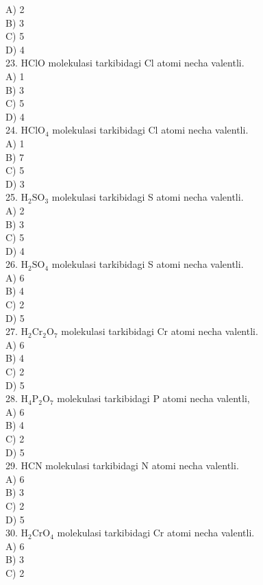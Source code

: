 A) 2\\
B) 3\\
C) 5\\
D) 4\\
23. HClO molekulasi tarkibidagi Cl atomi necha valentli.\\
A) 1\\
B) 3\\
C) 5\\
D) 4\\
24. $\mathrm{HClO}_{4}$ molekulasi tarkibidagi Cl atomi necha valentli.\\
A) 1\\
B) 7\\
C) 5\\
D) 3\\
25. $\mathrm{H}_{2} \mathrm{SO}_{3}$ molekulasi tarkibidagi S atomi necha valentli.\\
A) 2\\
B) 3\\
C) 5\\
D) 4\\
26. $\mathrm{H}_{2} \mathrm{SO}_{4}$ molekulasi tarkibidagi S atomi necha valentli.\\
A) 6\\
B) 4\\
C) 2\\
D) 5\\
27. $\mathrm{H}_{2} \mathrm{Cr}_{2} \mathrm{O}_{7}$ molekulasi tarkibidagi Cr atomi necha valentli.\\
A) 6\\
B) 4\\
C) 2\\
D) 5\\
28. $\mathrm{H}_{4} \mathrm{P}_{2} \mathrm{O}_{7}$ molekulasi tarkibidagi P atomi necha valentli,\\
A) 6\\
B) 4\\
C) 2\\
D) 5\\
29. HCN molekulasi tarkibidagi N atomi necha valentli.\\
A) 6\\
B) 3\\
C) 2\\
D) 5\\
30. $\mathrm{H}_{2} \mathrm{CrO}_{4}$ molekulasi tarkibidagi Cr atomi necha valentli.\\
A) 6\\
B) 3\\
C) 2\\
